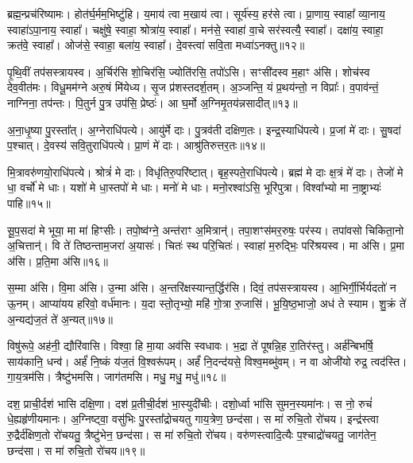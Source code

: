 ब्रह्म॒न्प्रच॑रिष्यामः। 
होत॑र्घ॒र्मम॒भिष्टु॑हि। 
य॒माय॑ त्वा म॒खाय॑ त्वा। 
सूर्य॑स्य॒ हर॑से त्वा। 
प्रा॒णाय॒ स्वाहा᳚ व्या॒नाय॒ स्वाहा॑ऽपा॒नाय॒ स्वाहा᳚। 
चक्षु॑षे॒ स्वाहा॒ श्रोत्रा॑य॒ स्वाहा᳚। 
मन॑से॒ स्वाहा॑ वा॒चे सर॑स्वत्यै॒ स्वाहा᳚। 
दक्षा॑य॒ स्वाहा॒ क्रत॑वे॒ स्वाहा᳚। 
ओज॑से॒ स्वाहा॒ बला॑य॒ स्वाहा᳚। 
दे॒वस्त्वा॑ सवि॒ता मध्वा॑ऽनक्तु॥१२॥

पृ॒थि॒वीं तप॑सस्त्रायस्व। 
अ॒र्चिर॑सि शो॒चिर॑सि॒ ज्योति॑रसि॒ तपो॑ऽसि। 
सꣳसी॑दस्व म॒हाꣳ अ॑सि। 
शोच॑स्व देव॒वीत॑मः। 
विधू॒मम॑ग्ने अरु॒षं मि॑येध्य। 
सृ॒ज प्र॑शस्तदर्\mbox{}श॒तम्। 
अ॒ञ्जन्ति॒ यं प्र॒थय॑न्तो॒ न विप्राः᳚। 
व॒पाव॑न्तं॒ नाग्निना॒ तप॑न्तः। 
पि॒तुर्न पु॒त्र उप॑सि॒ प्रेष्ठः॑। 
आ घ॒र्मो अ॒ग्निमृ॒तय॑न्नसादीत्॥१३॥

अ॒ना॒धृ॒ष्या पु॒रस्ता᳚त्। 
अ॒ग्नेराधि॑पत्ये। 
आयु॑र्मे दाः। 
पु॒त्रव॑ती दक्षिण॒तः। 
इन्द्र॒स्याधि॑पत्ये। 
प्र॒जां मे॑ दाः। 
सु॒षदा॑ प॒श्चात्। 
दे॒वस्य॑ सवि॒तुराधि॑पत्ये। 
प्रा॒णं मे॑ दाः। 
आश्रु॑तिरुत्तर॒तः॥१४॥

मि॒त्रावरु॑णयो॒राधि॑पत्ये। 
श्रोत्रं॑ मे दाः। 
विधृ॑तिरु॒परि॑ष्टात्। 
बृह॒स्पते॒राधि॑पत्ये। 
ब्रह्म॑ मे दाः क्ष॒त्रं मे॑ दाः। 
तेजो॑ मे धा॒ वर्चो॑ मे धाः। 
यशो॑ मे धा॒स्तपो॑ मे धाः। 
मनो॑ मे धाः। 
मनो॒रश्वा॑ऽसि॒ भूरि॑पुत्रा। 
विश्वा᳚भ्यो मा ना॒ष्ट्राभ्यः॑ पाहि॥१५॥

सू॒प॒सदा॑ मे भूया॒ मा मा॑ हिꣳसीः। 
तपो॒ष्व॑ग्ने॒ अन्त॑राꣳ अ॒मित्रान्॑। 
तपा॒शꣳस॑मर॒रुषः॒ पर॑स्य। 
तपा॑वसो चिकिता॒नो अ॒चित्तान्॑। 
वि ते॑ तिष्ठन्ताम॒जरा॑ अ॒यासः॑। 
चितः॑ स्थ परि॒चितः॑। 
स्वाहा॑ म॒रुद्भिः॒ परि॑श्रयस्व। 
मा अ॑सि। 
प्र॒मा अ॑सि। 
प्र॒ति॒मा अ॑सि॥१६॥

स॒म्मा अ॑सि। 
वि॒मा अ॑सि। 
उ॒न्मा अ॑सि। 
अ॒न्तरि॑क्षस्यान्त॒र्द्धि\-र॑सि। 
दिवं॒ तप॑सस्त्रायस्व। 
आ॒भिर्गी॒र्भिर्यदतो॑ न ऊ॒नम्। 
आप्या॑यय हरिवो॒ वर्ध॑मानः। 
य॒दा स्तो॒तृभ्यो॒ महि॑ गो॒त्रा रु॒जासि॑। 
भू॒यि॒ष्ठ॒भाजो॒ अध॑ ते स्याम। 
शु॒क्रं ते॑ अ॒न्यद्य॑ज॒तं ते॑ अ॒न्यत्॥१७॥

विषु॑रूपे॒ अह॑नी॒ द्यौरि॑वासि। 
विश्वा॒ हि मा॒या अव॑सि स्वधावः। 
भ॒द्रा ते॑ पूषन्नि॒ह रा॒तिर॑स्तु। 
अर्\mbox{}ह॑न्बिभर्\mbox{}षि॒ साय॑कानि॒ धन्व॑। 
अर्\mbox{}हं॑ नि॒ष्कं य॑ज॒तं  वि॒श्वरू॑पम्। 
अर्\mbox{}हं॑ नि॒दन्द॑यसे॒ विश्व॒मब्भु॑वम्। 
न वा ओजी॑यो रुद्र॒ त्वद॑स्ति। 
गा॒य॒त्रम॑सि। 
त्रैष्टु॑भमसि। 
जाग॑तमसि। 
मधु॒ मधु॒ मधु॑॥१८॥
\anuvakamend[अ॒न॒क्त्व॒सा॒दी॒दु॒त्त॒र॒तः पा॑हि प्रति॒मा अ॑सि यज॒तन्ते॑ अ॒न्यज्जाग॑तम॒स्येकं॑ च]

दश॒ प्राची॒र्दश॑ भासि दक्षि॒णा। 
दश॑ प्र॒तीची॒र्दश॑ भा॒स्युदी॑चीः। 
दशो॒र्ध्वा भा॑सि सुमन॒स्यमा॑नः। 
स नो॒ रुचं॑ धे॒ह्यहृ॑णीयमानः। 
अ॒ग्निष्ट्वा॒ वसु॑भिः पु॒रस्ता᳚द्रोचयतु गाय॒त्रेण॒ छन्द॑सा। 
स मा॑ रुचि॒तो रो॑चय। 
इन्द्र॑स्त्वा रु॒द्रैर्द॑क्षिण॒तो रो॑चयतु॒ त्रैष्टु॑भेन॒ छन्द॑सा। 
स मा॑ रुचि॒तो रो॑चय। 
वरु॑णस्त्वादि॒त्यैः प॒श्चाद्रो॑चयतु॒ जाग॑तेन॒ छन्द॑सा। 
स मा॑ रुचि॒तो रो॑चय॥१९॥

